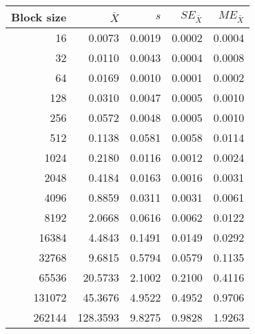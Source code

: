 \begin{tabular}{rrrrr}\toprule
{\small Block size} & $\bar{X}$ & $s$ & $SE_{\bar{X}}$ & $ME_{\bar{X}}$ \\\midrule
16 & 0.0073 & 0.0019 & 0.0002 & 0.0004\\
32 & 0.0110 & 0.0043 & 0.0004 & 0.0008\\
64 & 0.0169 & 0.0010 & 0.0001 & 0.0002\\
128 & 0.0310 & 0.0047 & 0.0005 & 0.0010\\
256 & 0.0572 & 0.0048 & 0.0005 & 0.0010\\
512 & 0.1138 & 0.0581 & 0.0058 & 0.0114\\
1024 & 0.2180 & 0.0116 & 0.0012 & 0.0024\\
2048 & 0.4184 & 0.0163 & 0.0016 & 0.0031\\
4096 & 0.8859 & 0.0311 & 0.0031 & 0.0061\\
8192 & 2.0668 & 0.0616 & 0.0062 & 0.0122\\
16384 & 4.4843 & 0.1491 & 0.0149 & 0.0292\\
32768 & 9.6815 & 0.5794 & 0.0579 & 0.1135\\
65536 & 20.5733 & 2.1002 & 0.2100 & 0.4116\\
131072 & 45.3676 & 4.9522 & 0.4952 & 0.9706\\
262144 & 128.3593 & 9.8275 & 0.9828 & 1.9263\\
\bottomrule
\end{tabular}

